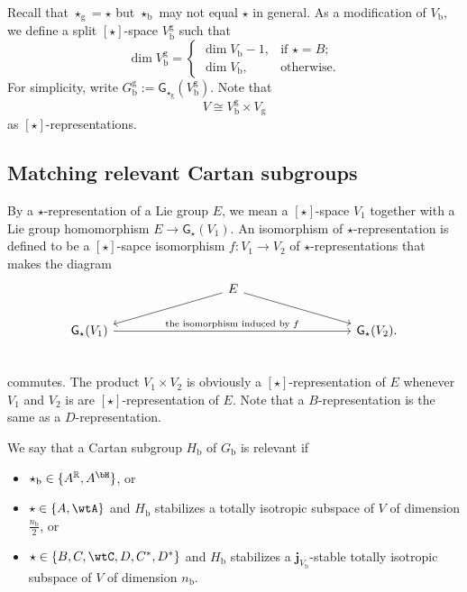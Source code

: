 \documentclass[12pt]{amsart}
\newcommand{\R}{\mathbb R}
\newcommand{\be}{\begin {equation}}
\newcommand{\ee}{\end {equation}}
\numberwithin{equation}{section}
\theoremstyle{remark}
\begin{document}
Recall that $\star_\mathrm g=\star$ but $\star_\mathrm b$ may not equal  $\star$ in general. As a modification of $V_\mathrm b$, we define a   split $[\star]$-space  $V_{\mathrm b}^\mathrm g$  such that
\[
 \dim V_{\mathrm b}^\mathrm g=
 \begin{cases}
   \dim V_{\mathrm b}-1,  &  \text{if $\star=B$};\\
   \dim V_{\mathrm b},    &  \text{otherwise}.
    \end{cases}
 \]
For simplicity, write $G_\mathrm b^\mathrm g:=\mathsf G_{\star_\mathrm g}(V_\mathrm b^\mathrm g)$. Note that
\be\label{isostar}
  V\cong V_\mathrm b^\mathrm g\times V_\mathrm g
\ee
as $[\star]$-representations.



\subsection{Matching relevant Cartan subgroups}




By a $\star$-representation of a Lie group $E$, we mean a $[\star]$-space $V_1$ together with a Lie group homomorphism $E\rightarrow \mathsf G_\star(V_1)$. An isomorphism of $\star$-representation is defined to be a $[\star]$-sapce  isomorphism $f: V_1\rightarrow V_2$ of  $\star$-representations that makes the diagram
\[
\begin{tikzcd}[column sep={4cm,between origins}]
      & E
      \ar[dl," "']\ar[dr,"  "]&\\
      \mathsf G_\star(V_1)\ar[rr,"\textrm{the isomorphism induced by $f$}"]& &\mathsf G_\star(V_2).\\
    \end{tikzcd}
\]
commutes. The product $V_1\times V_2$ is obviously a $[\star]$-representation of $E$ whenever $V_1$ and $ V_2$ is are $[\star]$-representation of $E$.
Note that a $B$-representation is the same as a $D$-representation.

We say that a Cartan subgroup $H_\mathrm b$ of $G_\mathrm b$ is relevant if
\begin{itemize}
\item
$\star_\mathrm b\in \{A^\R, A^\bH\}$, or
\item $\star\in \{A, \wtA\}$ and $H_\mathrm b$ stabilizes a totally isotropic subspace of $V$ of dimension $\frac{n_\mathrm b}{2}$, or
\item
 $\star\in \{B,C,\wtC, D, C^*, D^*\}$ and $H_\mathrm b$ stabilizes  a $\mathbf j_{V_\mathrm b}$-stable totally isotropic subspace of $V$ of dimension $n_\mathrm b$.
\end{itemize}
\end{document}
